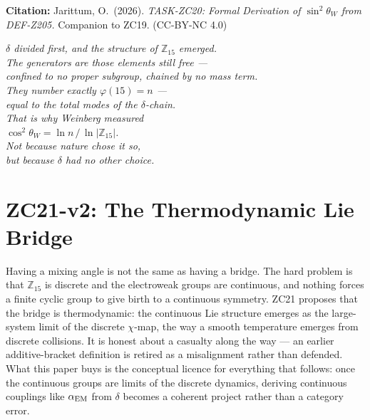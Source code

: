 \documentclass[12pt, a4paper]{article}
\begin{document}
\bigskip
\begin{center}
\textbf{Citation:} Jarittum, O.\ (2026).
\textit{TASK-ZC20: Formal Derivation of $\sin^2\theta_W$ from DEF-Z205.}
Companion to ZC19. (CC-BY-NC 4.0)
\end{center}

\bigskip
\begin{center}
\textit{%
  $\delta$ divided first, and the structure of $\mathbb{Z}_{15}$ emerged.\\[0.4em]
  The generators are those elements still free ---\\
  confined to no proper subgroup, chained by no mass term.\\[0.4em]
  They number exactly $\varphi(15) = n$ ---\\
  equal to the total modes of the $\delta$-chain.\\[0.4em]
  That is why Weinberg measured\\
  $\cos^2\theta_W = \ln n\,/\,\ln|\mathbb{Z}_{15}|$.\\[0.4em]
  Not because nature chose it so,\\
  but because $\delta$ had no other choice.%
}
\end{center}

\bigskip


\section{ZC21-v2: The Thermodynamic Lie Bridge}
\label{sec:zc21-thermo-lie}

Having a mixing angle is not the same as having a bridge. The hard problem is
that $\mathbb{Z}_{15}$ is discrete and the electroweak groups are continuous, and
nothing forces a finite cyclic group to give birth to a continuous symmetry.
ZC21 proposes that the bridge is thermodynamic: the continuous Lie structure
emerges as the large-system limit of the discrete $\chi$-map, the way a smooth
temperature emerges from discrete collisions. It is honest about a casualty along
the way --- an earlier additive-bracket definition is retired as a misalignment
rather than defended. What this paper buys is the conceptual licence for
everything that follows: once the continuous groups are limits of the discrete
dynamics, deriving continuous couplings like $\alpha_{\rm EM}$ from $\delta$
becomes a coherent project rather than a category error.
\end{document}

